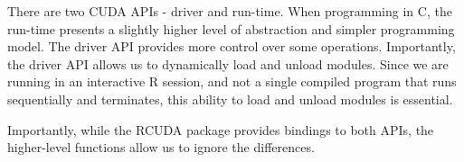 There are two CUDA APIs - driver and run-time.
When programming in C, the run-time presents a slightly higher level of abstraction
and simpler programming model. The driver API provides more control over some operations.
Importantly, the driver API allows us to dynamically load and unload modules.
Since we are running in an interactive R session, and not a single compiled program that runs
sequentially and terminates,  this ability to load and unload modules is essential.

Importantly, while the RCUDA package provides bindings to both APIs, 
the higher-level functions allow us to ignore the differences. %